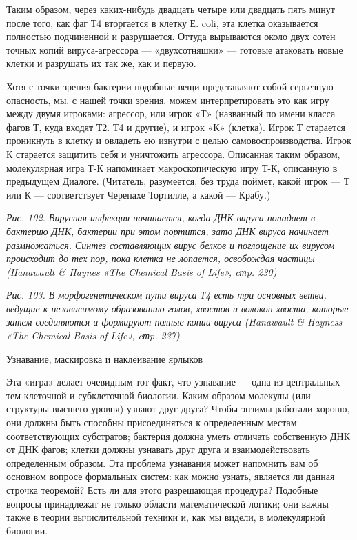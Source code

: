 Таким образом, через каких-нибудь двадцать четыре или двадцать пять минут после того, как фаг Т4 вторгается в клетку Е. coli, эта клетка оказывается полностью подчиненной и разрушается. Оттуда вырываются около двух сотен точных копий вируса-агрессора --- «двухсотняшки» --- готовые атаковать новые клетки и разрушать их так же, как и первую.

Хотя с точки зрения бактерии подобные вещи представляют собой серьезную опасность, мы, с нашей точки зрения, можем интерпретировать это как игру между двумя игроками: агрессор, или игрок «Т» (названный по имени класса фагов Т, куда входят Т2. Т4 и другие), и игрок «К» (клетка). Игрок Т старается проникнуть в клетку и овладеть ею изнутри с целью самовоспроизводства. Игрок К старается защитить себя и уничтожить агрессора. Описанная таким образом, молекулярная игра Т-К напоминает макроскопическую игру Т-К, описанную в предыдущем Диалоге. (Читатель, разумеется, без труда поймет, какой игрок --- Т или К --- соответствует Черепахе Тортилле, а какой --- Крабу.)

\emph{Рис. 102. Вирусная инфекция начинается, когда ДНК вируса попадает в бактерию ДНК, бактерии при этом портится, зато ДНК вируса начинает размножаться. Синтез составляющих вирус белков и поглощение их вирусом происходит до тех пор, пока клетка не лопается, освобождая частицы (Hanawault \& Haynes «The Chemical Basis of Life», cтp. 230)}

\emph{Рис. 103. В морфогенетическом пути вируса Т4 есть три основных ветви, ведущие к независимому образованию голов, хвостов и волокон хвоста, которые затем соединяются и формируют полные копии вируса (Hanawault \& Hayness «The Chemical Basis of Life», cтp. 237)}

Узнавание, маскировка и наклеивание ярлыков

Эта «игра» делает очевидным тот факт, что узнавание --- одна из центральных тем клеточной и субклеточной биологии. Каким образом молекулы (или структуры высшего уровня) узнают друг друга? Чтобы энзимы работали хорошо, они должны быть способны присоединяться к определенным местам соответствующих субстратов; бактерия должна уметь отличать собственную ДНК от ДНК фагов; клетки должны узнавать друг друга и взаимодействовать определенным образом. Эта проблема узнавания может напомнить вам об основном вопросе формальных систем: как можно узнать, является ли данная строчка теоремой? Есть ли для этого разрешающая процедура? Подобные вопросы принадлежат не только области математической логики; они важны также в теории вычислительной техники и, как мы видели, в молекулярной биологии.

